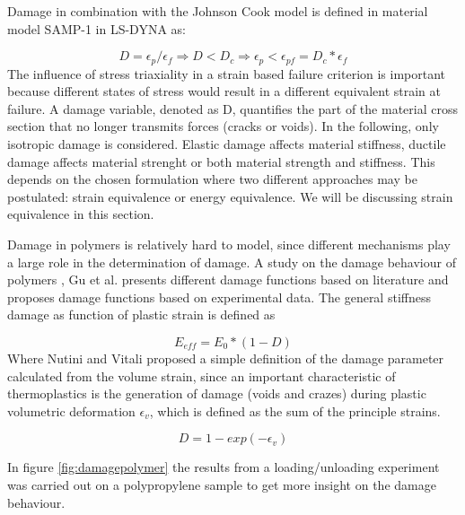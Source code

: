 Damage in combination with the Johnson Cook model is defined in material model SAMP-1 in LS-DYNA as:

\begin{equation}\label{AzziTsai}
D=\epsilon_p/\epsilon_f\Rightarrow D<D_c\Rightarrow\epsilon_p<\epsilon_{pf}=D_c*\epsilon_f
\end{equation}The influence of stress triaxiality in a strain based failure criterion is important because different states of stress would result in a different equivalent strain at failure\cite{BoisA:}. 
A damage variable, denoted as D, quantifies the part of the material cross section that no longer transmits forces (cracks or voids). In the following, only isotropic damage is considered. Elastic damage affects material stiffness, ductile damage affects material strenght or both material strength and stiffness. This depends on the chosen formulation where two different approaches may be postulated: strain equivalence or energy equivalence. We will be discussing strain equivalence in this section. 

Damage in polymers is relatively hard to model, since different mechanisms play a large role in the determination of damage. A study on the damage behaviour of polymers \cite{Gu2013ExperimentalThermoplastics}, Gu et al. presents different damage functions based on literature and proposes damage functions based on experimental data. 
The general stiffness damage as function of plastic strain is defined as

\begin{equation}\label{stiffnessdamage}
E_{eff}=E_0*(1-D)
\end{equation}Where Nutini and Vitali proposed a simple definition of the damage parameter calculated from the volume strain, since an important characteristic of thermoplastics is the generation of damage (voids and crazes) during plastic volumetric deformation $\epsilon_v$, which is defined as the sum of the principle strains.

\begin{equation}\label{eqn:stiffnessdamage}
D=1-exp(-\epsilon_v)
\end{equation}

In figure \ref{fig:damagepolymer} the results from a loading/unloading experiment was carried out on a polypropylene sample to get more insight on the damage behaviour. 

